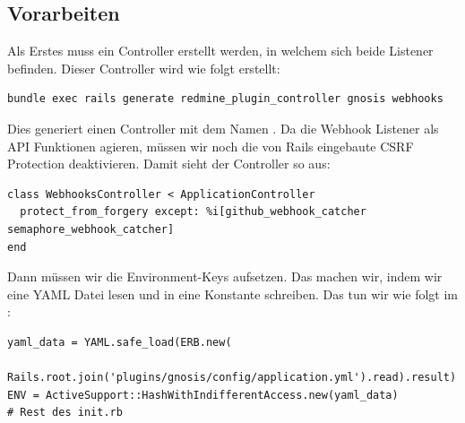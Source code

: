 \subsection{Vorarbeiten}
\label{sec:webhook_prework}
Als Erstes muss ein Controller erstellt werden, in welchem sich beide Listener befinden. Dieser Controller wird wie
folgt erstellt:
\begin{codebox}[]
  \begin{verbatim}
bundle exec rails generate redmine_plugin_controller gnosis webhooks
  \end{verbatim}
\end{codebox}

\newpage
Dies generiert einen Controller mit dem Namen . Da die Webhook Listener als
API Funktionen agieren, müssen wir noch die von Rails eingebaute CSRF Protection deaktivieren. Damit sieht der
Controller so aus:
\begin{codebox}[]
  \begin{verbatim}
class WebhooksController < ApplicationController
  protect_from_forgery except: %i[github_webhook_catcher semaphore_webhook_catcher]
end
  \end{verbatim}
\end{codebox}

Dann müssen wir die Environment-Keys aufsetzen. Das machen wir, indem wir eine YAML Datei lesen und in eine Konstante
schreiben. Das tun wir wie folgt im :
\begin{codebox}[]
  \begin{verbatim}
yaml_data = YAML.safe_load(ERB.new(
  Rails.root.join('plugins/gnosis/config/application.yml').read).result)
ENV = ActiveSupport::HashWithIndifferentAccess.new(yaml_data)
# Rest des init.rb
  \end{verbatim}
\end{codebox}

\newpage

